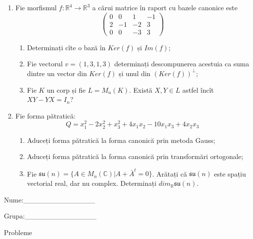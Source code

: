 \documentclass{article}
\begin{document}
\begin{enumerate}
 \item Fie morfismul $f:\mathbb{R}^4 \to \mathbb{R}^3$ a cărui matrice în raport cu bazele canonice este
$$\begin{pmatrix}
0&0&1&-1\\
2&-1&-2&3\\
0&0&-3&3
\end{pmatrix}$$

\begin{enumerate}
\item Determinați cîte o bază în $Ker(f)$ și $Im(f)$;
\item Fie vectorul $v=(1,3,1,3)$ determinați descompunerea acestuia ca suma dintre un vector din $Ker(f)$ și unul din $(Ker(f))^\perp$;
\item Fie $K$ un corp și fie $L=M_n(K)$. Există $X,Y \in L$ astfel încît $XY-YX=I_n$?  
\end{enumerate}
\item Fie forma pătratică:
$$Q= x_1^2-2x_2^2+x_3^2+4x_1x_2-10x_1x_3+4x_2x_3$$

\begin{enumerate}
\item Aduceți forma pătratică la forma canonică prin metoda Gauss;
\item Aduceți forma pătratică la forma canonică prin transformări ortogonale;
\item Fie $\mathfrak{su}(n)=\{ A \in M_n(\mathbb{C}) | A+\bar{A}^t=0\}$. Arătați că $\mathfrak{su}(n)$ este spațiu vectorial real, dar nu complex.
Determinați $dim_{\mathbb{R}}\mathfrak{su}(n)$.
\end{enumerate}
\end{enumerate}
\newpage
\begin{flushright}
Nume:\_\_\_\_\_\_\_\_\_\_\_\_\_\_
 
 
Grupa:\_\_\_\_\_\_\_\_\_\_\_\_\_\_
\end{flushright}
\begin{center}
\vspace{2cm}
{\Large Probleme}
\vspace{2cm}
\end{center}
\end{document}
